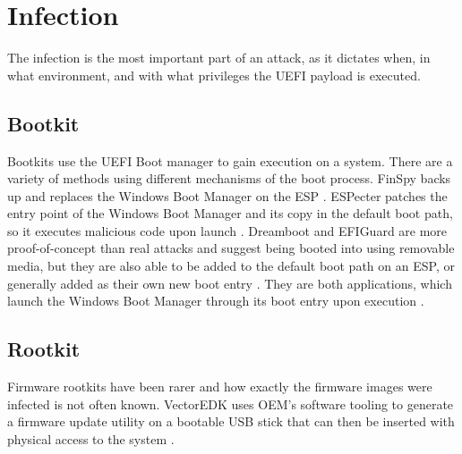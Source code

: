 \section{Infection}
\vspace{-0.5em}

The infection is the most important part of an attack, as it dictates when, in what environment, and with what privileges the \ac{UEFI} payload is executed.

\vspace{-0.5em}
\subsection{Bootkit}
\vspace{-0.5em}

Bootkits use the \ac{UEFI} Boot manager to gain execution on a system.
There are a variety of methods using different mechanisms of the boot process.
FinSpy backs up and replaces the Windows Boot Manager  on the \ac{ESP} \cite{finspy}.
ESPecter patches the entry point of the Windows Boot Manager  and its copy  in the default boot path, so it executes malicious code upon launch \cite{especter}.
Dreamboot and EFIGuard are more proof-of-concept than real attacks and suggest being booted into using removable media, but they are also able to be added to the default boot path on an \ac{ESP}, or generally added as their own new boot entry \cite{efiguard}.
They are both applications, which launch the Windows Boot Manager through its boot entry upon execution \cite{dreamboot, efiguard}.

\subsection{Rootkit}

Firmware rootkits have been rarer and how exactly the firmware images were infected is not often known.
VectorEDK uses \ac{OEM}'s software tooling to generate a firmware update utility on a bootable \ac{USB} stick that can then be inserted with physical access to the system \cite{mosaicregressor}.

